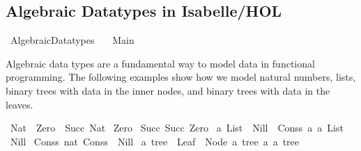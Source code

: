 %
\begin{isabellebody}%
%
%
\begin{isamarkuptext}%
\section*{Algebraic Datatypes in Isabelle/HOL}%
\end{isamarkuptext}\isamarkuptrue%
%
\isadelimtheory
%
\endisadelimtheory
%
\isatagtheory
{}\isamarkupfalse%
\ Algebraic{\isacharunderscore}{\kern0pt}Datatypes\isanewline
\ \ \ Main\isanewline
{}%
\endisatagtheory
{\isafoldtheory}%
%
\isadelimtheory
%
\endisadelimtheory
%
\begin{isamarkuptext}%
Algebraic data types are a fundamental way to model data in functional programming. The
      following examples show how we model natural numbers, lists, binary trees with data in the
      inner nodes, and binary trees with data in the leaves.%
\end{isamarkuptext}\isamarkuptrue%
\isamarkupfalse%
\ Nat\ {\isacharequal}{\kern0pt}\ Zero\ {\isacharbar}{\kern0pt}\ Succ\ Nat\isanewline
\isanewline
{}\isamarkupfalse%
\ {\isachardoublequoteopen}Zero{\isachardoublequoteclose}\isanewline
{}\isamarkupfalse%
\ {\isachardoublequoteopen}Succ\ {\isacharparenleft}{\kern0pt}Succ\ Zero{\isacharparenright}{\kern0pt}{\isachardoublequoteclose}\isanewline
\isanewline
{}\isamarkupfalse%
\ {\isacharprime}{\kern0pt}a\ List\ {\isacharequal}{\kern0pt}\ Nill\ {\isacharbar}{\kern0pt}\ Conss\ {\isacharprime}{\kern0pt}a\ {\isachardoublequoteopen}{\isacharprime}{\kern0pt}a\ List{\isachardoublequoteclose}\isanewline
\isanewline
{}\isamarkupfalse%
\ {\isachardoublequoteopen}Nill{\isachardoublequoteclose}\isanewline
{}\isamarkupfalse%
\ {\isachardoublequoteopen}Conss\ {\isacharparenleft}{\kern0pt}{}{\isacharcolon}{\kern0pt}{\isacharcolon}{\kern0pt}nat{\isacharparenright}{\kern0pt}\ {\isacharparenleft}{\kern0pt}Conss\ {}\ Nill{\isacharparenright}{\kern0pt}{\isachardoublequoteclose}\isanewline
\isanewline
{}\isamarkupfalse%
\ {\isacharprime}{\kern0pt}a\ tree\ {\isacharequal}{\kern0pt}\ Leaf\ {\isacharbar}{\kern0pt}\ Node\ {\isachardoublequoteopen}{\isacharprime}{\kern0pt}a\ tree{\isachardoublequoteclose}\ {\isacharprime}{\kern0pt}a\ {\isachardoublequoteopen}{\isacharprime}{\kern0pt}a\ tree{\isachardoublequoteclose}\isanewline

\end{isabellebody}
